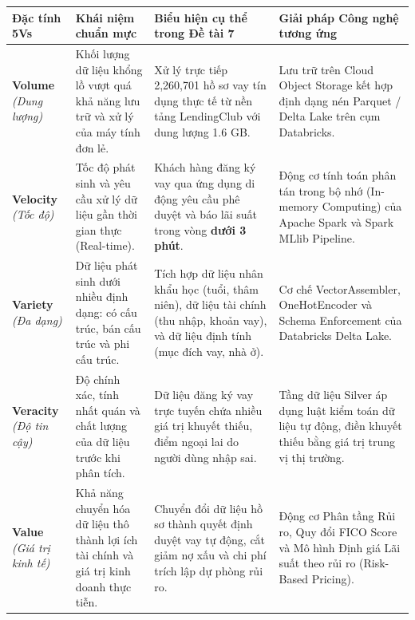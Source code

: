 \documentclass[
  13pt,
  a4paper,
]{report}
\newcounter{none} %
\begin{document}
{\def\LTcaptype{none} %
\begin{longtable}[]{@{}
  >{\raggedright\arraybackslash}p{}
  >{\raggedright\arraybackslash}p{}
  >{\raggedright\arraybackslash}p{}
  >{\raggedright\arraybackslash}p{}@{}}
\toprule\noalign{}
\begin{minipage}[b]{\linewidth}\raggedright
Đặc tính 5Vs
\end{minipage} & \begin{minipage}[b]{\linewidth}\raggedright
Khái niệm chuẩn mực
\end{minipage} & \begin{minipage}[b]{\linewidth}\raggedright
Biểu hiện cụ thể trong Đề tài 7
\end{minipage} & \begin{minipage}[b]{\linewidth}\raggedright
Giải pháp Công nghệ tương ứng
\end{minipage} \\
\midrule\noalign{}
\endhead
\bottomrule\noalign{}
\endlastfoot
\textbf{Volume} \emph{(Dung lượng)} & Khối lượng dữ liệu khổng lồ vượt
quá khả năng lưu trữ và xử lý của máy tính đơn lẻ. & Xử lý trực tiếp
2,260,701 hồ sơ vay tín dụng thực tế từ nền tảng LendingClub với dung
lượng 1.6 GB. & Lưu trữ trên Cloud Object Storage kết hợp định dạng nén
Parquet / Delta Lake trên cụm Databricks. \\
\textbf{Velocity} \emph{(Tốc độ)} & Tốc độ phát sinh và yêu cầu xử lý dữ
liệu gần thời gian thực (Real-time). & Khách hàng đăng ký vay qua ứng
dụng di động yêu cầu phê duyệt và báo lãi suất trong vòng \textbf{dưới 3
phút}. & Động cơ tính toán phân tán trong bộ nhớ (In-memory Computing)
của Apache Spark và Spark MLlib Pipeline. \\
\textbf{Variety} \emph{(Đa dạng)} & Dữ liệu phát sinh dưới nhiều định
dạng: có cấu trúc, bán cấu trúc và phi cấu trúc. & Tích hợp dữ liệu nhân
khẩu học (tuổi, thâm niên), dữ liệu tài chính (thu nhập, khoản vay), và
dữ liệu định tính (mục đích vay, nhà ở). & Cơ chế VectorAssembler,
OneHotEncoder và Schema Enforcement của Databricks Delta Lake. \\
\textbf{Veracity} \emph{(Độ tin cậy)} & Độ chính xác, tính nhất quán và
chất lượng của dữ liệu trước khi phân tích. & Dữ liệu đăng ký vay trực
tuyến chứa nhiều giá trị khuyết thiếu, điểm ngoại lai do người dùng nhập
sai. & Tầng dữ liệu Silver áp dụng luật kiểm toán dữ liệu tự động, điền
khuyết thiếu bằng giá trị trung vị thị trường. \\
\textbf{Value} \emph{(Giá trị kinh tế)} & Khả năng chuyển hóa dữ liệu
thô thành lợi ích tài chính và giá trị kinh doanh thực tiễn. & Chuyển
đổi dữ liệu hồ sơ thành quyết định duyệt vay tự động, cắt giảm nợ xấu và
chi phí trích lập dự phòng rủi ro. & Động cơ Phân tầng Rủi ro, Quy đổi
FICO Score và Mô hình Định giá Lãi suất theo rủi ro (Risk-Based
Pricing). \\
\end{longtable}
}
\end{document}
